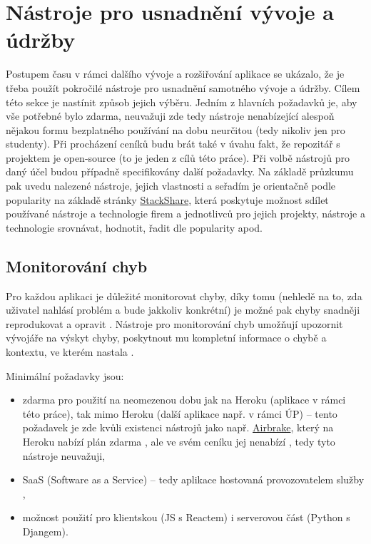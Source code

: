 \chapter{Nástroje pro usnadnění vývoje a údržby}

Postupem času v rámci dalšího vývoje a rozšiřování aplikace se ukázalo, že je třeba použít pokročilé nástroje pro usnadnění samotného vývoje a údržby. Cílem této sekce je nastínit způsob jejich výběru. Jedním z hlavních požadavků je, aby vše potřebné bylo zdarma, neuvažuji zde tedy nástroje nenabízející alespoň nějakou formu bezplatného používání na dobu neurčitou (tedy nikoliv jen pro studenty). Při procházení ceníků budu brát také v úvahu fakt, že repozitář s projektem je open-source (to je jeden z cílů této práce). Při volbě nástrojů pro daný účel budou případně specifikovány další požadavky. Na základě průzkumu pak uvedu nalezené nástroje, jejich vlastnosti a seřadím je orientačně podle popularity na základě stránky \href{https://stackshare.io/}{StackShare}, která poskytuje \cite{stackshare} možnost sdílet používané nástroje a technologie firem a jednotlivců pro jejich projekty, nástroje a technologie srovnávat, hodnotit, řadit dle popularity apod.

\section{Monitorování chyb}
Pro každou aplikaci je důležité monitorovat chyby, díky tomu (nehledě na to, zda uživatel nahlásí problém a bude jakkoliv konkrétní) je možné pak chyby snadněji reprodukovat a opravit \cite{tools-exception}. Nástroje pro monitorování chyb umožňují upozornit vývojáře na výskyt chyby, poskytnout mu kompletní informace o chybě a kontextu, ve kterém nastala \cite{tools-exception}.

Minimální požadavky jsou:
\begin{itemize}
    \item zdarma pro použití na neomezenou dobu jak na Heroku (aplikace v rámci této práce), tak mimo Heroku (další aplikace např. v rámci ÚP) -- tento požadavek je zde kvůli existenci nástrojů jako např. \href{https://airbrake.io/}{Airbrake}, který na Heroku nabízí plán zdarma \cite{airbrake-heroku}, ale ve svém ceníku jej nenabízí \cite{airbrake-pricing}, tedy tyto nástroje neuvažuji,
    \item SaaS (Software as a Service) -- tedy aplikace hostovaná provozovatelem služby \cite{oracle-saas},
    \item možnost použití pro klientskou (JS s Reactem) i serverovou část (Python s Djangem).
\end{itemize}

